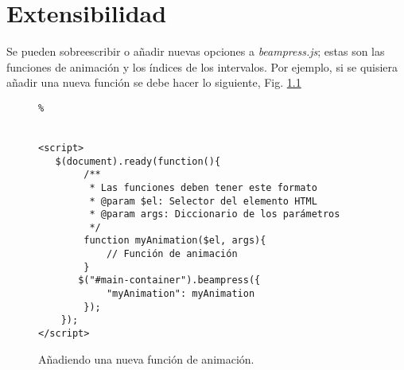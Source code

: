 \chapter{Extensibilidad} %
\label{cha:extensibilidad}
	Se pueden sobreescribir o añadir nuevas opciones a \textit{beampress.js}; estas son
	las funciones de animación y los índices de los intervalos. Por ejemplo, si se quisiera
	añadir una nueva función se debe hacer lo siguiente, Fig. \ref{fig:ex6}

		\begin{figure}[htb]%
			\begin{lstlisting}%


<script>
   $(document).ready(function(){
       	/**
		 * Las funciones deben tener este formato
		 * @param $el: Selector del elemento HTML  
		 * @param args: Diccionario de los parámetros
		 */
   		function myAnimation($el, args){
   			// Función de animación 
   		}     
       $("#main-container").beampress({
       		"myAnimation": myAnimation
       	});
    });
</script>

			\end{lstlisting}
		\caption{
			Añadiendo una nueva función de animación. 
			\label{fig:ex6} }
		\end{figure}	

